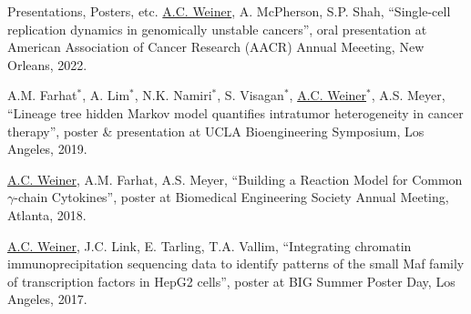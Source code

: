 \documentclass{resume} %
\begin{document}
\begin{rSection}{Presentations, Posters, etc.}
\underline{A.C. Weiner}, A. McPherson, S.P. Shah, ``Single-cell replication dynamics in genomically unstable cancers'', oral presentation at American Association of Cancer Research (AACR) Annual Meeeting, New Orleans, 2022.

A.M. Farhat$^{\ast}$, A. Lim$^{\ast}$, N.K. Namiri$^{\ast}$, S. Visagan$^{\ast}$, \underline{A.C. Weiner$^{\ast}$}, A.S. Meyer, ``Lineage tree hidden Markov model quantifies intratumor heterogeneity in cancer therapy'', poster \& presentation at UCLA Bioengineering Symposium, Los Angeles, 2019.

\underline{A.C. Weiner}, A.M. Farhat, A.S. Meyer, ``Building a Reaction Model for Common $\gamma$-chain Cytokines'', poster at Biomedical Engineering Society Annual Meeting, Atlanta, 2018.

\underline{A.C. Weiner}, J.C. Link, E. Tarling, T.A. Vallim, ``Integrating chromatin immunoprecipitation sequencing data to identify patterns of the small Maf family of transcription factors in HepG2 cells'', poster at BIG Summer Poster Day, Los Angeles, 2017.

\end{rSection}


\end{document}
